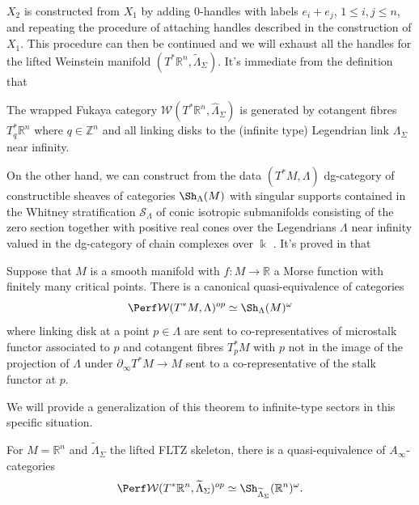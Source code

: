 $X_2$ is constructed from $X_1$ by adding $0$-handles with labels $e_i+e_j$, $1\leq i,j\leq n$, and repeating the procedure of attaching handles described in the construction of $X_1$.
This procedure can then be continued and we will exhaust all the handles for the lifted Weinstein manifold $(T^{\ast}\mathbb{R}^n,\widetilde{\Lambda}_{\Sigma})$.
It's immediate from the definition that
\begin{lmm}\label{lmm:Fukaya-category-Gmn-equivariant-generation}
    The wrapped Fukaya category $\mathcal{W} (T^{\ast}\mathbb{R}^n,\widehat{\Lambda}_{\Sigma})$ is generated by cotangent fibres $T^{\ast}_q\mathbb{R}^n$ where $q\in\mathbb{Z}^n$ and all linking disks to the (infinite type) Legendrian link $\Lambda_{\Sigma}$ near infinity.
\end{lmm}
On the other hand, we can construct from the data $(T^{\ast}M,\Lambda)$ dg-category of constructible sheaves of categories $\Sh_{\Lambda} (M)$ with singular supports contained in the Whitney stratification $\mathcal{S}_{\Lambda}$ of conic isotropic submanifolds consisting of the zero section together with positive real cones over the Legendrians $\Lambda$ near infinity valued in the dg-category of chain complexes over $\Bbbk$ \cite{GPS24M}.
It's proved in \cite{GPS24M} that
\begin{thm}\label{thm:sheaf-Floer-correspondence}
    Suppose that $M$ is a smooth manifold with $f\colon M\to\mathbb{R}$ a Morse function with finitely many critical points. There is a canonical quasi-equivalence of categories $$
        \Perf\mathcal{W} (T^{\ast} M,\Lambda)^{op}\simeq\Sh_{\Lambda} (M)^{\omega}
    $$where linking disk at a point $p\in\Lambda$ are sent to co-representatives of microstalk functor associated to $p$ and cotangent fibres $T^{\ast}_p M$ with $p$ not in the image of the projection of $\Lambda$ under $\partial_{\infty} T^{\ast} M\to M$ sent to a co-representative of the stalk functor at $p$.
\end{thm}
We will provide a generalization of this theorem to infinite-type sectors in this specific situation.
\begin{prp}\label{prp:inf-type-sheaf-Floer-Rn}
    For $M=\mathbb{R}^n$ and $\widetilde{\Lambda}_{\Sigma}$ the lifted FLTZ skeleton, there is a quasi-equivalence of $A_{\infty}$-categories \[
        \Perf\mathcal{W} (T^{\ast}\mathbb{R}^n,\widetilde{\Lambda}_{\Sigma})^{op}\simeq\Sh_{\widetilde{\Lambda}_{\Sigma}} (\mathbb{R}^n)^{\omega}.
    \]
\end{prp}
